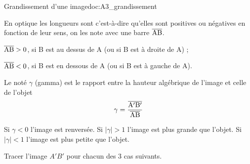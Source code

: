 \begin{doc}{Grandissement d'une image}{doc:A3_grandissement}
  
  \begin{importants}
    En optique les longueurs sont  c'est-à-dire qu'elles sont positives ou négatives en fonction de leur sens, on les note avec une barre $\overline{\mathrm{AB}}$.
  \end{importants}
  \begin{listePoints}
    \item $\overline{\mathrm{AB}} > 0$, si B est au dessus de A (ou si B est à droite de A) ;
    \item $\overline{\mathrm{AB}} < 0$, si B est en dessous de A (ou si B est à gauche de A).
  \end{listePoints}
  
  \begin{importants}
    Le  noté $\gamma$ (gamma) est le rapport entre la hauteur algébrique de l'image et celle de l'objet
    \begin{equation*}
      \gamma = \dfrac{\overline{\mathrm{A'B'}}}{\overline{\mathrm{AB}}}
    \end{equation*}
  \end{importants}
  Si $\gamma < 0$ l'image est renversée.
  Si $|\gamma| > 1$ l'image est plus grande que l'objet. 
  Si $|\gamma| < 1$ l'image est plus petite que l'objet.
\end{doc}


\nomPrenomClasse

\numeroQuestion
Tracer l'image $A'B'$ pour chacun des 3 cas suivants.

\begin{center}  
  \vspace*{24pt}
  
  \vspace*{24pt}
  
\end{center}





